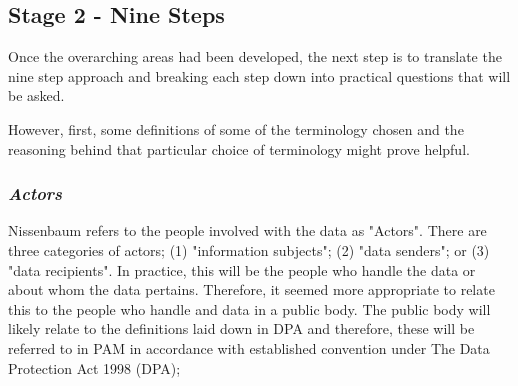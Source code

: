 \subsection {Stage 2 - Nine Steps}

Once the overarching areas had been developed, the next step is to translate the nine step approach and breaking each step down into practical questions that will be asked.

However, first, some definitions of some of the terminology chosen and the reasoning behind that particular choice of terminology might prove helpful.

\subsubsection {{\it Actors}}
Nissenbaum refers to the people involved with the data as "Actors". There are three categories of actors; (1) "information subjects"; (2) "data senders"; or (3) "data recipients". In practice, this will be the people who handle the data or about whom the data pertains. Therefore, it seemed more appropriate to relate this to the people who handle and data in a public body. The public body will likely relate to the definitions laid down in DPA and therefore, these will be referred to in PAM in accordance with established convention under The Data Protection Act 1998 (DPA); 

